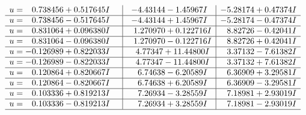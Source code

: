 \documentclass[1p]{elsarticle_modified}
\theoremstyle{definition}
\begin{document}
$$\begin{array}{c|c|c}
\begin{aligned}
u &= \phantom{-}0.738456 + 0.517645 I\end{aligned}
 & -4.43144 - 1.45967 I & -5.28174 + 0.47374 I \\ \hline\begin{aligned}
u &= \phantom{-}0.738456 - 0.517645 I\end{aligned}
 & -4.43144 + 1.45967 I & -5.28174 - 0.47374 I \\ \hline\begin{aligned}
u &= \phantom{-}0.831064 + 0.096380 I\end{aligned}
 & \phantom{-}1.270970 + 0.122716 I & \phantom{-}8.82726 - 0.42041 I \\ \hline\begin{aligned}
u &= \phantom{-}0.831064 - 0.096380 I\end{aligned}
 & \phantom{-}1.270970 - 0.122716 I & \phantom{-}8.82726 + 0.42041 I \\ \hline\begin{aligned}
u &= -0.126989 + 0.822033 I\end{aligned}
 & \phantom{-}4.77347 + 11.44800 I & \phantom{-}3.37132 - 7.61382 I \\ \hline\begin{aligned}
u &= -0.126989 - 0.822033 I\end{aligned}
 & \phantom{-}4.77347 - 11.44800 I & \phantom{-}3.37132 + 7.61382 I \\ \hline\begin{aligned}
u &= \phantom{-}0.120864 + 0.820667 I\end{aligned}
 & \phantom{-}6.74638 - 6.20589 I & \phantom{-}6.36909 + 3.29581 I \\ \hline\begin{aligned}
u &= \phantom{-}0.120864 - 0.820667 I\end{aligned}
 & \phantom{-}6.74638 + 6.20589 I & \phantom{-}6.36909 - 3.29581 I \\ \hline\begin{aligned}
u &= \phantom{-}0.103336 + 0.819213 I\end{aligned}
 & \phantom{-}7.26934 - 3.28559 I & \phantom{-}7.18981 + 2.93019 I \\ \hline\begin{aligned}
u &= \phantom{-}0.103336 - 0.819213 I\end{aligned}
 & \phantom{-}7.26934 + 3.28559 I & \phantom{-}7.18981 - 2.93019 I\\
 \hline 
 \end{array}$$\newpage$$\begin{array}{c|c|c}  

\end{array}$$
\end{document}
